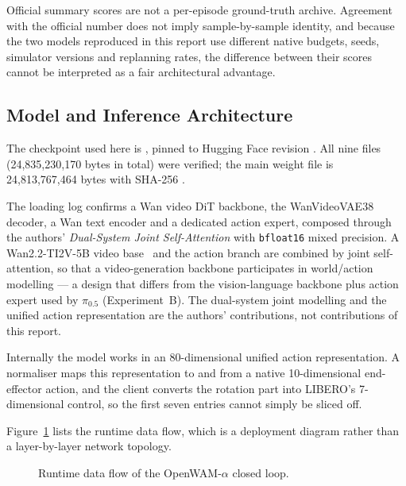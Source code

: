 Official summary scores are not a per-episode ground-truth archive. Agreement
with the official number does not imply sample-by-sample identity, and because
the two models reproduced in this report use different native budgets, seeds,
simulator versions and replanning rates, the difference between their scores
cannot be interpreted as a fair architectural advantage.

\subsection{Model and Inference Architecture}
\label{sec:owa-model}

The checkpoint used here is
,
pinned to Hugging Face revision
.
All nine files (24{,}835{,}230{,}170 bytes in total) were verified; the main
weight file is 24{,}813{,}767{,}464 bytes with SHA-256
.

The loading log confirms a Wan video DiT backbone, the WanVideoVAE38 decoder, a
Wan text encoder and a dedicated action expert, composed through the authors'
\emph{Dual-System Joint Self-Attention} with \texttt{bfloat16} mixed precision.
A Wan2.2-TI2V-5B video base~\cite{wan2025} and the action branch are combined by
joint self-attention, so that a video-generation backbone participates in
world/action modelling --- a design that differs from the vision-language
backbone plus action expert used by $\pi_{0.5}$ (Experiment~B). The dual-system
joint modelling and the unified action representation are the authors'
contributions, not contributions of this report.

Internally the model works in an 80-dimensional unified action representation.
A normaliser maps this representation to and from a native 10-dimensional
end-effector action, and the client converts the rotation part into LIBERO's
7-dimensional control, so the first seven entries cannot simply be sliced off.

Figure~\ref{fig:owa-dataflow} lists the runtime data flow, which is a
deployment diagram rather than a layer-by-layer network topology.

\begin{figure}[H]
  \centering
  \caption{Runtime data flow of the OpenWAM-$\alpha$ closed loop.}
  \label{fig:owa-dataflow}
\end{figure}

